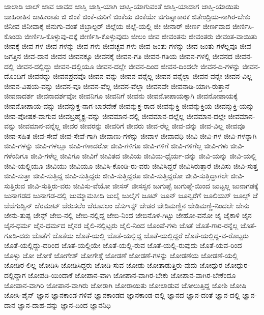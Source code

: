 {ಜಾಲಾಡಿ
ಜಾಲ್
ಜಾವ
ಜಾವದ
ಜಾಸ್ತಿ
ಜಾಸ್ತಿ-ಯಾಗಿ
ಜಾಸ್ತಿ-ಯಾಗುವಂತೆ
ಜಾಸ್ತಿ-ಯಾದಾಗ
ಜಾಸ್ತಿ-ಯಾಯಿತು
ಜಾಹಿರಾತಿನ
ಜಾಹೀರಾತು
ಜಿ
ಜಿಂಕೆ
ಜಿಂಕೆ-ಮರಿಗೆ
ಜಿಂಕೆಯ
ಜಿಂಕೆಯೇ
ಜಿಗುಪ್ಸಾಕಾರಕ
ಜಿತೇಂದ್ರಿಯ-ನಾಗಿರ-ಬೇಕು
ಜಿನೀವ
ಜಿನೀವಾಕ್ಕೆ
ಜಿನುಗು-ವಂತೆ
ಜಿಬ್ರಾಲ್ಟರ್
ಜಿಲ್ಲೆಯ
ಜಿಲ್ಲೆ-ಯಲ್ಲಿ
ಜೀ
ಜೀನಾರ್
ಜೀರ್ಣ
ಜೀರ್ಣವಾದ
ಜೀರ್ಣಿಸಿ-ಕೊಂಡು
ಜೀರ್ಣಿಸಿ-ಕೊಳ್ಳುವು-ದಕ್ಕೆ
ಜೀರ್ಣಿಸಿ-ಕೊಳ್ಳುವುದು
ಜೀಲಂ
ಜೀವ
ಜೀವಂತನು
ಜೀವಂತರು
ಜೀವಂತ-ವಾಯಿತು
ಜೀವಕ್ಕೆ
ಜೀವ-ಗಳ
ಜೀವ-ಗಳನ್ನು
ಜೀವ-ಗಳು
ಜೀವಚ್ಛವ-ಗಳು
ಜೀವ-ಜಂತು-ಗಳನ್ನು
ಜೀವ-ಜಂತು-ಗಳೆಲ್ಲವೂ
ಜೀವ-ಜಗತ್ತಿನ
ಜೀವ-ದಾನ
ಜೀವನ
ಜೀವನಕ್ಕೂ
ಜೀವನಕ್ಕೆ
ಜೀವನ-ಗತಿ
ಜೀವನ-ಗತಿಯ
ಜೀವನ-ಗಳಲ್ಲಿ
ಜೀವನದ
ಜೀವನ-ದಲ್ಲಿ
ಜೀವನ-ದಲ್ಲಿದ್ದು
ಜೀವನ-ದಲ್ಲಿಯೂ
ಜೀವನ-ದಲ್ಲೇ
ಜೀವನ-ದಿಂದ
ಜೀವನ-ದಿಂದಲೇ
ಜೀವನ-ದಿ-ಗಳನ್ನು
ಜೀವನ-ದೊಂದಿಗೆ
ಜೀವನದ್ದು
ಜೀವನಪ್ರದವೊ
ಜೀವನ-ವನ್ನು
ಜೀವನ-ವನ್ನೆಲ್ಲ
ಜೀವನ-ವನ್ನೆಲ್ಲಾ
ಜೀವನ-ವನ್ನೇ
ಜೀವನ-ವಿಲ್ಲ
ಜೀವನ-ವಿಷಯ-ವನ್ನು
ಜೀವನ-ವೂ
ಜೀವನ-ವೆಲ್ಲ
ಜೀವನ-ವೆಲ್ಲಾ
ಜೀವನವೇ
ಜೀವನಾಡಿ-ಯಾಗಿ-ರುತ್ತಾನೆ
ಜೀವನಾದರ್ಶ
ಜೀವನಾದರ್ಶವೋ
ಜೀವನಿಗೂ
ಜೀವನಿಗೆ
ಜೀವನು
ಜೀವನೋಪಾಯಕ್ಕಾಗಿ
ಜೀವನೋಪಾಯಕ್ಕೆ
ಜೀವನೋಪಾಯ-ವನ್ನು
ಜೀವನ್ಮುಕ್ತ-ನಾಗ-ಬಾರದೇಕೆ
ಜೀವನ್ಮುಕ್ತ-ರಾದ
ಜೀವನ್ಮುಕ್ತಿ
ಜೀವನ್ಮುಕ್ತಿಯ
ಜೀವನ್ಮುಕ್ತಿ-ಯನ್ನು
ಜೀವ-ಪೋಷಕ-ವಾಗುವ
ಜೀವಬ್ರಹ್ಮೈಕ್ಯ-ವನ್ನು
ಜೀವಮಾನ-ದಲ್ಲಿ
ಜೀವಮಾನ-ದಲ್ಲೆಲ್ಲ
ಜೀವಮಾನ-ದಲ್ಲೇ
ಜೀವಮಾನ-ವನ್ನು
ಜೀವಮಾನ-ವನ್ನೆಲ್ಲ
ಜೀವರ
ಜೀವರನ್ನು
ಜೀವರಿಗೆ
ಜೀವರು
ಜೀವ-ರೆಲ್ಲ
ಜೀವ-ವನ್ನು
ಜೀವ-ವಿಲ್ಲ
ಜೀವವೂ
ಜೀವ-ಸಹಿತ
ಜೀವ-ಸೇವೆ
ಜೀವ-ಸೇವೆ-ಗಾಗಿ
ಜೀವಾಣು-ಗಳನ್ನು
ಜೀವಾಳ
ಜೀವಾವಧಿ
ಜೀವಿ
ಜೀವಿ-ಗಳ
ಜೀವಿ-ಗಳನ್ನಾಗಿ
ಜೀವಿ-ಗಳನ್ನು
ಜೀವಿ-ಗಳಲ್ಲೂ
ಜೀವಿ-ಗಳಾದರೋ
ಜೀವಿ-ಗಳಿಗೂ
ಜೀವಿ-ಗಳಿಗೆ
ಜೀವಿ-ಗಳಿಗೆಲ್ಲ
ಜೀವಿ-ಗಳು
ಜೀವಿ-ಗಳೆಂದಿಗೂ
ಜೀವಿ-ಗಳೆಲ್ಲ
ಜೀವಿಗೂ
ಜೀವಿಗೆ
ಜೀವಿತದ
ಜೀವಿಯ
ಜೀವಿಯ-ಧೈರ್ಯ-ವನ್ನು
ಜೀವಿ-ಯನ್ನು
ಜೀವಿ-ಯಲ್ಲಿ
ಜೀವಿ-ಯಲ್ಲಿಯೂ
ಜೀವಿಯು
ಜೀವಿಯೂ
ಜೀವಿಸಿ-ಕೊಂಡಿ-ರು-ವರು
ಜೀವಿಸಿದ್ದರೆ
ಜೀವಿಸಿರುತ್ತಾರೆ
ಜೀವಿಸು
ಜೀವಿ-ಸುತ್ತ
ಜೀವಿ-ಸುತ್ತಾ
ಜೀವಿ-ಸುತ್ತಿದ್ದ
ಜೀವಿ-ಸುತ್ತಿದ್ದರು
ಜೀವಿ-ಸುತ್ತಿದ್ದರೂ
ಜೀವಿ-ಸುತ್ತಿದ್ದರೋ
ಜೀವಿ-ಸುತ್ತಿದ್ದಾಗಲೇ
ಜೀವಿ-ಸುತ್ತಿರುವ
ಜೀವಿ-ಸುತ್ತಿರು-ವರು
ಜೀವಿಸು-ವೆಯೋ
ಜೀಸಸ್
ಜೀಸಸ್ಸನ
ಜುಗುಪ್ಸೆ
ಜುಗುಪ್ಸೆ-ಯಿಂದ
ಜುಟ್ಟಲ್ಲ
ಜುನಾಗಡಕ್ಕೆ
ಜುನಾಗಡದ
ಜುನಾಗಡ-ದಲ್ಲಿ
ಜುಮ್ಮಾಮಸೀದಿ
ಜುಲೈ
ಜುಲೈಗೆ
ಜೂಟ್
ಜೂನ್
ಜೂನ್ವರೆಗೆ
ಜೂಲಿಯಸ್
ಜೂಲ್ಸ್
ಜೆ
ಜೆಜೆಗುಡ್ವಿನ್
ಜೆರಮಾಟ್
ಜೆರುಸಲೆಂ
ಜೆರೂಸಲಂ
ಜೆಸುಇಸ್ಟ್
ಜೇಡರ
ಜೇಡಿಮಣ್ಣಿನ
ಜೇಡಿಮಣ್ಣಿ-ನಿಂದಲೇ
ಜೇನು
ಜೇನು-ತುಪ್ಪ
ಜೇನ್ಸ್
ಜೇಬಿ-ನಲ್ಲಿ
ಜೇಬಿ-ನಲ್ಲಿದ್ದ
ಜೇಬಿ-ನಿಂದ
ಜೇಬಿನೊಳ-ಗಿಟ್ಟು
ಜೇಹೋ-ವನೋ
ಜೈ
ಜೈಕಾಳಿ
ಜೈನ
ಜೈನ-ಧರ್ಮ
ಜೈನ-ಧರ್ಮದ
ಜೈನರ
ಜೈಲಿ-ನಲ್ಲಿಟ್ಟರು
ಜೈಲಿ-ನಿಂದ
ಜೊಂಪೆ-ಗಳು
ಜೊತೆ
ಜೊತೆ-ಗಾರ-ರನ್ನೆಲ್ಲ
ಜೊತೆ-ಗೂಡಿ-ದರು
ಜೊತೆಗೆ
ಜೊತೆಯ
ಜೊತೆ-ಯಲ್ಲಿ
ಜೊತೆ-ಯಲ್ಲಿದ್ದ
ಜೊತೆ-ಯಲ್ಲಿದ್ದರೆ
ಜೊತೆ-ಯಲ್ಲಿದ್ದ-ವ-ರೊಬ್ಬರು
ಜೊತೆ-ಯಲ್ಲಿದ್ದು-ದರಿಂದ
ಜೊತೆ-ಯಲ್ಲಿಯೇ
ಜೊತೆ-ಯಲ್ಲಿ-ರುವ
ಜೊತೆ-ಯಲ್ಲಿ-ರುವುದು
ಜೊತೆ-ಯವ-ರಿಂದ
ಜೊಳ್ಳು
ಜೋ
ಜೋಕೆ
ಜೋಗೇಶ್
ಜೋಗೇಶ್ಗೆ
ಜೋಡಣೆ
ಜೋಡಣೆ-ಗಳನ್ನು
ಜೋಡಣೆಯ
ಜೋಡಣೆ-ಯಲ್ಲಿ
ಜೋಡಿರ-ಲಿಲ್ಲ
ಜೋಡಿಸಿ
ಜೋಡಿಸಿದ್ದರು
ಜೋಡಿ-ಸುವ
ಜೋಡು
ಜೋತಾಡುತ್ತಿರು-ವುದು
ಜೋಧ್ಪುರ
ಜೋಧ್ಪುರ-ದಲ್ಲಿದ್ದಾಗ
ಜೋಪಡಿ-ಯಿಂದಾಕೆ
ಜೋಪಾನ-ವಾಗಿ
ಜೋಪಾನ-ವಾಗಿರ-ಬೇಕು
ಜೋಪಾನ-ವಾಗಿರ-ಬೇಕೆಂದೂ
ಜೋಪಾನ-ವಾಗಿರಿ
ಜೋಪಾನ-ವಾಗಿರು
ಜೋರಾಗಿ
ಜೋರಾಯಿತು
ಜೋಲಾಡುವ
ಜೋಲುತ್ತಿದ್ದ
ಜೋಶಿ
ಜೋಷಿ
ಜೋಸಿ-ಪೈನ್
ಜ್ಞಾನ
ಜ್ಞಾನಕಾಂಡ-ಗಳಿವೆ
ಜ್ಞಾನಕಾಂಡದ
ಜ್ಞಾನಕಾಂಡ-ದಲ್ಲಿ
ಜ್ಞಾನದ
ಜ್ಞಾನ-ದಂತೆ
ಜ್ಞಾನ-ದಲ್ಲಿ
ಜ್ಞಾನ-ದಾನ
ಜ್ಞಾನ-ದಾಹ-ವನ್ನು
ಜ್ಞಾನ-ದಿಂದ
ಜ್ಞಾನನಿಧಿ
}
